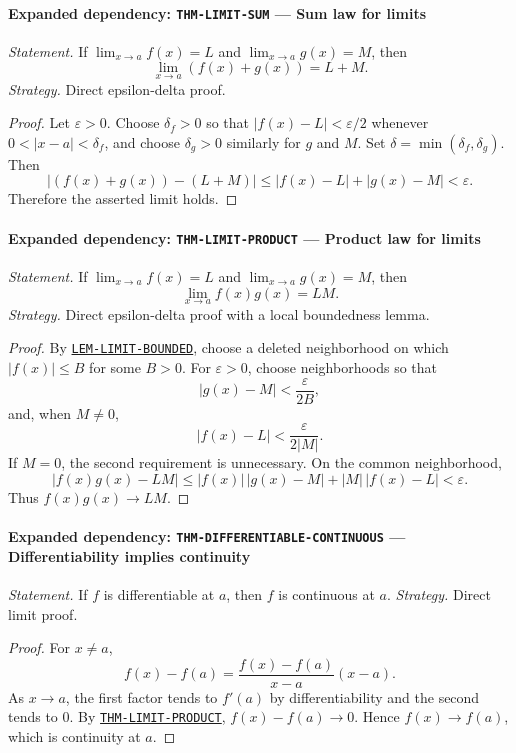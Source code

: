 \documentclass[10pt]{article}
\newcommand{\pidraw}[1]{\begingroup\urlstyle{tt}\nolinkurl{#1}\endgroup}
\newcommand{\pidref}[1]{\hyperref[prf:#1]{\pidraw{#1}}}
\newcommand{\pid}[1]{\pidref{#1}}
\theoremstyle{definition}
\theoremstyle{remark}
\begin{document}
\paragraph{Expanded dependency: \pidraw{THM-LIMIT-SUM} --- Sum law for limits}
\textit{Statement.} If $\lim_{x\to a}f(x)=L$ and $\lim_{x\to a}g(x)=M$, then
\[
\lim_{x\to a}(f(x)+g(x))=L+M.
\]
\textit{Strategy.} Direct epsilon-delta proof.
\begin{proof}Let $\varepsilon>0$. Choose $\delta_f>0$ so that
$|f(x)-L|<\varepsilon/2$ whenever $0<|x-a|<\delta_f$, and choose
$\delta_g>0$ similarly for $g$ and $M$. Set
$\delta=\min(\delta_f,\delta_g)$. Then
\[
|(f(x)+g(x))-(L+M)|
\le |f(x)-L|+|g(x)-M|<\varepsilon.
\]
Therefore the asserted limit holds.\end{proof}

\paragraph{Expanded dependency: \pidraw{THM-LIMIT-PRODUCT} --- Product law for limits}
\textit{Statement.} If $\lim_{x\to a}f(x)=L$ and $\lim_{x\to a}g(x)=M$, then
\[
\lim_{x\to a}f(x)g(x)=LM.
\]
\textit{Strategy.} Direct epsilon-delta proof with a local boundedness lemma.
\begin{proof}By \pid{LEM-LIMIT-BOUNDED}, choose a deleted neighborhood on which
$|f(x)|\le B$ for some $B>0$. For $\varepsilon>0$, choose neighborhoods so that
\[
|g(x)-M|<\frac{\varepsilon}{2B},
\]
and, when $M\ne0$,
\[
|f(x)-L|<\frac{\varepsilon}{2|M|}.
\]
If $M=0$, the second requirement is unnecessary. On the common neighborhood,
\[
|f(x)g(x)-LM|
\le |f(x)|\,|g(x)-M|+|M|\,|f(x)-L|<\varepsilon.
\]
Thus $f(x)g(x)\to LM$.\end{proof}

\paragraph{Expanded dependency: \pidraw{THM-DIFFERENTIABLE-CONTINUOUS} --- Differentiability implies continuity}
\textit{Statement.} If $f$ is differentiable at $a$, then $f$ is continuous at $a$.
\textit{Strategy.} Direct limit proof.
\begin{proof}For $x\ne a$,
\[
f(x)-f(a)=
\frac{f(x)-f(a)}{x-a}(x-a).
\]
As $x\to a$, the first factor tends to $f'(a)$ by differentiability and the
second tends to $0$. By \pid{THM-LIMIT-PRODUCT},
$f(x)-f(a)\to0$. Hence $f(x)\to f(a)$, which is continuity at $a$.\end{proof}
\end{document}
